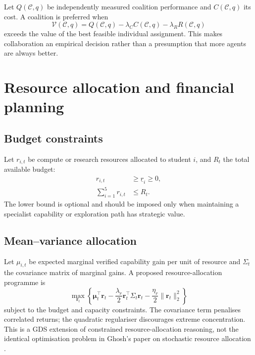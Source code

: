 \documentclass[11pt,a4paper]{article}
\begin{document}
Let \(Q(\mathcal C,q)\) be independently measured coalition performance and \(C(\mathcal C,q)\) its cost. A coalition is preferred when
\begin{equation}
\mathcal V(\mathcal C,q)
=
Q(\mathcal C,q)
-\lambda_C C(\mathcal C,q)
-\lambda_R R(\mathcal C,q)
\end{equation}
exceeds the value of the best feasible individual assignment. This makes collaboration an empirical decision rather than a presumption that more agents are always better.

\section{Resource allocation and financial planning}

\subsection{Budget constraints}

Let \(r_{i,t}\) be compute or research resources allocated to student \(i\), and \(R_t\) the total available budget:
\begin{align}
r_{i,t}&\geq \underline r_i\geq0,\\
\sum_{i=1}^{5}r_{i,t}&\leq R_t.
\end{align}
The lower bound is optional and should be imposed only when maintaining a specialist capability or exploration path has strategic value.

\subsection{Mean--variance allocation}

Let \(\mu_{i,t}\) be expected marginal verified capability gain per unit of resource and \(\Sigma_t\) the covariance matrix of marginal gains. A proposed resource-allocation programme is
\begin{equation}
\max_{\mathbf r_t}
\left\{
\boldsymbol{\mu}_t^\top\mathbf r_t
-\frac{\lambda_r}{2}\mathbf r_t^\top\Sigma_t\mathbf r_t
-\frac{\eta_r}{2}\|\mathbf r_t\|_2^2
\right\}
\end{equation}
subject to the budget and capacity constraints. The covariance term penalises correlated returns; the quadratic regulariser discourages extreme concentration. This is a GDS extension of constrained resource-allocation reasoning, not the identical optimisation problem in Ghosh's paper on stochastic resource allocation \cite{ghosh2026resource}.
\end{document}
